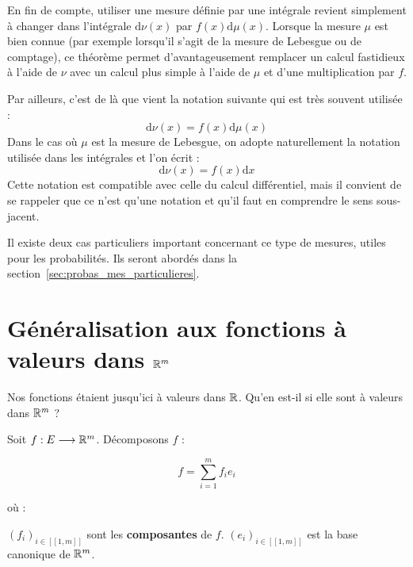 \documentclass[../integ-proba.tex]{subfiles}
\begin{document}
    \begin{rem}
        En fin de compte, utiliser une mesure définie par une intégrale revient simplement à changer dans l'intégrale $\text{d}\nu(x)$ par $f(x) \text{d}\mu(x)$.
        Lorsque la mesure $\mu$ est bien connue (par exemple lorsqu'il s'agit de la mesure de Lebesgue ou de comptage), ce théorème permet d'avantageusement remplacer un calcul fastidieux à l'aide de $\nu$ avec un calcul plus simple à l'aide de $\mu$ et d'une multiplication par $f$.

        Par ailleurs, c'est de là que vient la notation suivante qui est très souvent utilisée :
        \begin{displaymath}
          \text{d}\nu(x) = f(x) \text{d}\mu(x)
        \end{displaymath}
        Dans le cas où $\mu$ est la mesure de Lebesgue, on adopte naturellement la notation utilisée dans les intégrales et l'on écrit :
        \begin{displaymath}
          \text{d}\nu(x) = f(x) \text{d}x
        \end{displaymath}
        Cette notation est compatible avec celle du calcul différentiel, mais il convient de se rappeler que ce n'est qu'une notation et qu'il faut en comprendre le sens sous-jacent.
    \end{rem}

  Il existe deux cas particuliers important concernant ce type de mesures, utiles pour les probabilités.
  Ils seront abordés dans la section~\ref{sec:probas_mes_particulieres}.

  \section{Généralisation aux fonctions à valeurs dans $\mathbb{R}^m$}

  Nos fonctions étaient jusqu'ici à valeurs dans $\mathbb{R}$.
  Qu'en est-il si elle sont à valeurs dans $\mathbb{R}^m$ ?

  Soit $f:E\longrightarrow \mathbb{R}^m$.
  Décomposons $f$ :

  \begin{displaymath}
    f = \sum_{i=1}^{m}f_i e_i
  \end{displaymath}

  où :
  \begin{itemize}
    \itemb $\left(f_i\right)_{i\in[\![1,m]\!]}$ sont les \textbf{composantes} de $f$.
    \itemb $\left(e_i\right)_{i\in[\![1,m]\!]}$ est la base canonique de $\mathbb{R}^m$.
  \end{itemize}
\end{document}

